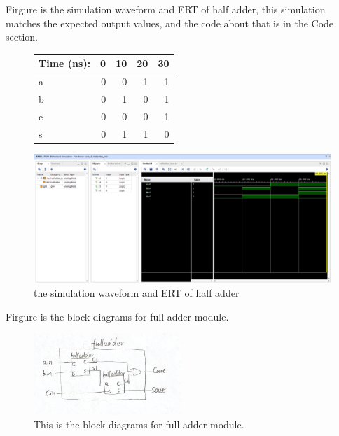 \documentclass[11pt]{article}
\begin{document}
Firgure is the simulation waveform and ERT of half adder, this simulation matches the expected output values, and the code about that is in the Code section. \\
\begin{figure}[ht]\centering
	\begin{tabular}{l|rrrr}
		Time (ns): & 0 & 10 & 20 & 30 \\
		\midrule
		a & 0 & 0 & 1 & 1 \\
		b & 0 & 1 & 0 & 1 \\
		\midrule
		c & 0 & 0 & 0 & 1 \\
		s & 0 & 1 & 1 & 0 \\
		\bottomrule
	\end{tabular}\medskip
		
	\includegraphics{HalfAdderSimulation}
	\caption{the simulation waveform and ERT of half adder}
	\label{fig:HalfAdderSimulation}
\end{figure}

Firgure is the block diagrams for full adder module. \\
\begin{figure}[ht]\centering    
	\includegraphics[width=0.5\textwidth]{fulladder}    
	\caption{This is the block diagrams for full adder module.}    
	\label{fig:fulladder}
\end{figure}
\end{document}
